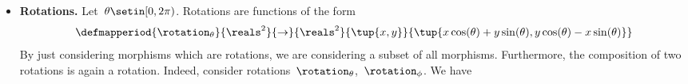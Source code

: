 {\begin{solution}
\begin{itemize}
\begin{equation}
                  \defmapperiod{
                      \translation_{s,t}
                  }{
                      \reals^2
                  }{
                      \to
                  }{
                      \reals^2
                  }{
                      \tup{x,y}
                  }{
                      \tup{x+s,y+t}
                  }
              \end{equation}
              By just considering morphisms which are translations, we are considering a subset of all morphisms.
              Furthermore, the composition of two translations is again a translation.
              Indeed, consider scalings~$\translation_{s,t}$,~$\translation_{u,v}$.
              We have
              \begin{equation}
                  \begin{aligned}
                      (\translation_{s,t}\mthen \translation_{u,v})(x,y)
                       & =\translation_{u,v}(x+s, y+t) \\
                       & =\tup{x+s+u, y+t+v} \\
                       & =\translation_{s+u,t+v}.
                  \end{aligned}
              \end{equation}
              Finally, the  in \Draw corresponds to a translation of the form $\translation_{0,0}$.
        \item \textbf{Rotations.}
              Let~$\theta \setin [0,2\pi)$.
              Rotations are functions of the form
              \begin{equation}
                  \defmapperiod{
                      \rotation_{\theta}
                  }{
                      \reals^2
                  }{
                      \to
                  }{
                      \reals^2
                  }{
                      \tup{x,y}
                  }{
                      \tup{x\cos(\theta)+y\sin(\theta), y\cos(\theta)-x\sin(\theta)}
                  }
              \end{equation}
              By just considering morphisms which are rotations, we are considering a subset of all morphisms.
              Furthermore, the composition of two rotations is again a rotation.
              Indeed, consider rotations~$\rotation_{\theta}$,~$\rotation_{\phi}$.
              We have
              \begin{equation}
                  \begin{aligned}

\end{aligned}
\end{equation}
\end{itemize}
\end{solution}}
